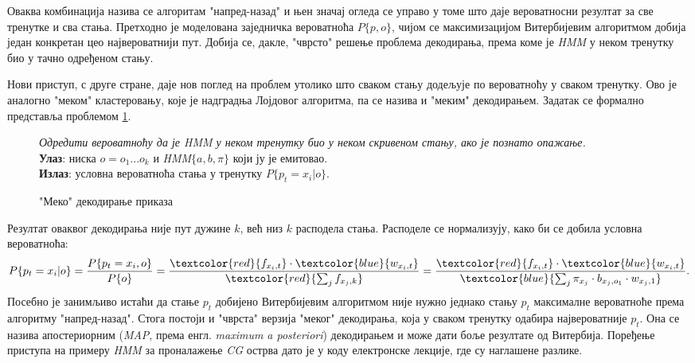\documentclass[12pt,oneside]{memoir}
\newenvironment{problem}[1][!ht]
{\renewcommand{\algorithmcfname}{Проблем}
\begin{figure}[!ht]
\centering
  \begin{minipage}{.94\linewidth}
	\begin{algorithm}[#1]%
  }{\end{algorithm}
  \end{minipage}
\end{figure}}
\begin{document}
\begin{CJK}{UTF8}{ipxm}
Оваква комбинација назива се алгоритам "напред-назад" и њен значај огледа се управо у томе што даје вероватносни резултат за све тренутке и сва стања. Претходно је моделована заједничка вероватноћа $P\{p, o\}$, чијом се максимизацијом Витербијевим алгоритмом добија један конкретан цео највероватнији пут. Добија се, дакле, "чврсто" решење проблема декодирања, према коме је \textit{HMM} у неком тренутку био у тачно одређеном стању.

Нови приступ, с друге стране, даје нов поглед на проблем утолико што сваком стању додељује по вероватноћу у сваком тренутку. Ово је аналогно "меком" кластеровању, које је надградња Лојдовог алгоритма, па се назива и "меким" декодирањем. Задатак се формално представља проблемом \ref{prob:meko}.

\begin{problem}[H]
  \SetAlgoLined
  \textit{Одредити вероватноћу да је \textit{HMM} у неком тренутку био у неком скривеном стању, ако је познато опажање.}\\
  \textbf{Улаз}: ниска $o = o_1...o_k$ и \textit{HMM}$\{a, b, \pi\}$ који ју је емитовао.\\
  \textbf{Излаз}: условна вероватноћа стања у тренутку $P\{p_t = x_i | o\}$.
  \caption{"Меко" декодирање приказа \cite{ba10j}}
  \label{prob:meko}
\end{problem}

Резултат оваквог декодирања није пут дужине $k$, већ низ $k$ расподела стања. Расподеле се нормализују, како би се добила условна вероватноћа: $$P\{p_t = x_i | o\} = \frac{P\{p_t = x_i, o\}}{P\{o\}} = \frac{\textcolor{red}{f_{x_i, t}} \cdot \textcolor{blue}{w_{x_i, t}}}{\textcolor{red}{\sum_j f_{x_j, k}}} = \frac{\textcolor{red}{f_{x_i, t}} \cdot \textcolor{blue}{w_{x_i, t}}}{\textcolor{blue}{\sum_j \pi_{x_j} \cdot b_{x_j, o_1} \cdot w_{x_j, 1}}}.$$ Посебно је занимљиво истаћи да стање $p_t$ добијено Витербијевим алгоритмом није нужно једнако стању $p_t$ максималне вероватноће према алгоритму "напред-назад". Стога постоји и "чврста" верзија "меког" декодирања, која у сваком тренутку одабира највероватније $p_t$. Она се назива апостериорним (\textit{MAP}, према енгл. \textit{maximum a posteriori}) декодирањем и може дати боље резултате од Витербија. Поређење приступа на примеру \textit{HMM} за проналажење \textit{CG} острва дато је у коду електронске лекције, где су наглашене разлике.



\end{CJK}
\end{document}
